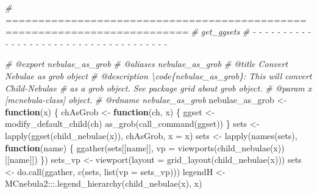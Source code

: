 \documentclass[
]{article}
\newenvironment{Shaded}{\begin{snugshade}}{\end{snugshade}}
\newcommand{\AttributeTok}[1]{\textcolor[rgb]{0.77,0.63,0.00}{#1}}
\newcommand{\CommentTok}[1]{\textcolor[rgb]{0.56,0.35,0.01}{\textit{#1}}}
\newcommand{\ControlFlowTok}[1]{\textcolor[rgb]{0.13,0.29,0.53}{\textbf{#1}}}
\newcommand{\FunctionTok}[1]{\textcolor[rgb]{0.00,0.00,0.00}{#1}}
\newcommand{\NormalTok}[1]{#1}
\newcommand{\OtherTok}[1]{\textcolor[rgb]{0.56,0.35,0.01}{#1}}
\newcommand{\SpecialCharTok}[1]{\textcolor[rgb]{0.00,0.00,0.00}{#1}}
\begin{document}
\begin{Shaded}
\begin{Highlighting}[]
\CommentTok{\# ==========================================================================}
\CommentTok{\# get\_ggsets}
\CommentTok{\# {-} {-} {-} {-} {-} {-} {-} {-} {-} {-} {-} {-} {-} {-} {-} {-} {-} {-} {-} {-} {-} {-} {-} {-} {-} {-} {-} {-} {-} {-} {-} {-} {-} {-} {-} {-} {-}}

\CommentTok{\#\textquotesingle{} @export nebulae\_as\_grob}
\CommentTok{\#\textquotesingle{} @aliases nebulae\_as\_grob}
\CommentTok{\#\textquotesingle{} @title Convert Nebulae as \textquotesingle{}grob\textquotesingle{} object}
\CommentTok{\#\textquotesingle{} @description \textbackslash{}code\{nebulae\_as\_grob\}: This will convert Child{-}Nebulae}
\CommentTok{\#\textquotesingle{} as a \textquotesingle{}grob\textquotesingle{} object. See package \textasciigrave{}grid\textasciigrave{} about \textquotesingle{}grob\textquotesingle{} object.}
\CommentTok{\#\textquotesingle{} @param x [mcnebula{-}class] object.}
\CommentTok{\#\textquotesingle{} @rdname nebulae\_as\_grob}
\NormalTok{nebulae\_as\_grob }\OtherTok{\textless{}{-}} \ControlFlowTok{function}\NormalTok{(x) \{}
\NormalTok{  chAsGrob }\OtherTok{\textless{}{-}} \ControlFlowTok{function}\NormalTok{(ch, x) \{}
\NormalTok{    ggset }\OtherTok{\textless{}{-}} \FunctionTok{modify\_default\_child}\NormalTok{(ch)}
    \FunctionTok{as\_grob}\NormalTok{(}\FunctionTok{call\_command}\NormalTok{(ggset))}
\NormalTok{  \}}
\NormalTok{  sets }\OtherTok{\textless{}{-}} \FunctionTok{lapply}\NormalTok{(}\FunctionTok{ggset}\NormalTok{(}\FunctionTok{child\_nebulae}\NormalTok{(x)), chAsGrob, }\AttributeTok{x =}\NormalTok{ x)}
\NormalTok{  sets }\OtherTok{\textless{}{-}} \FunctionTok{lapply}\NormalTok{(}\FunctionTok{names}\NormalTok{(sets),}
    \ControlFlowTok{function}\NormalTok{(name) \{}
      \FunctionTok{ggather}\NormalTok{(sets[[name]],}
        \AttributeTok{vp =} \FunctionTok{viewports}\NormalTok{(}\FunctionTok{child\_nebulae}\NormalTok{(x))[[name]])}
\NormalTok{    \})}
\NormalTok{  sets\_vp }\OtherTok{\textless{}{-}} \FunctionTok{viewport}\NormalTok{(}\AttributeTok{layout =} \FunctionTok{grid\_layout}\NormalTok{(}\FunctionTok{child\_nebulae}\NormalTok{(x)))}
\NormalTok{  sets }\OtherTok{\textless{}{-}} \FunctionTok{do.call}\NormalTok{(ggather, }\FunctionTok{c}\NormalTok{(sets, }\FunctionTok{list}\NormalTok{(}\AttributeTok{vp =}\NormalTok{ sets\_vp)))}
\NormalTok{  legendH }\OtherTok{\textless{}{-}}\NormalTok{ MCnebula2}\SpecialCharTok{:::}\FunctionTok{.legend\_hierarchy}\NormalTok{(}\FunctionTok{child\_nebulae}\NormalTok{(x), x)}

\end{Highlighting}
\end{Shaded}
\end{document}
